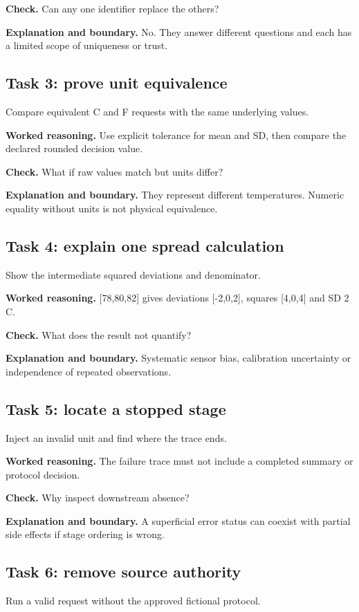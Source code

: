 \textbf{Check.} Can any one identifier replace the others?

\textbf{Explanation and boundary.} No. They answer different questions and each has a limited scope of uniqueness or trust.

\subsection{Task 3: prove unit equivalence}
Compare equivalent C and F requests with the same underlying values.

\textbf{Worked reasoning.} Use explicit tolerance for mean and SD, then compare the declared rounded decision value.

\textbf{Check.} What if raw values match but units differ?

\textbf{Explanation and boundary.} They represent different temperatures. Numeric equality without units is not physical equivalence.

\subsection{Task 4: explain one spread calculation}
Show the intermediate squared deviations and denominator.

\textbf{Worked reasoning.} [78,80,82] gives deviations [-2,0,2], squares [4,0,4] and SD 2 C.

\textbf{Check.} What does the result not quantify?

\textbf{Explanation and boundary.} Systematic sensor bias, calibration uncertainty or independence of repeated observations.

\subsection{Task 5: locate a stopped stage}
Inject an invalid unit and find where the trace ends.

\textbf{Worked reasoning.} The failure trace must not include a completed summary or protocol decision.

\textbf{Check.} Why inspect downstream absence?

\textbf{Explanation and boundary.} A superficial error status can coexist with partial side effects if stage ordering is wrong.

\subsection{Task 6: remove source authority}
Run a valid request without the approved fictional protocol.

